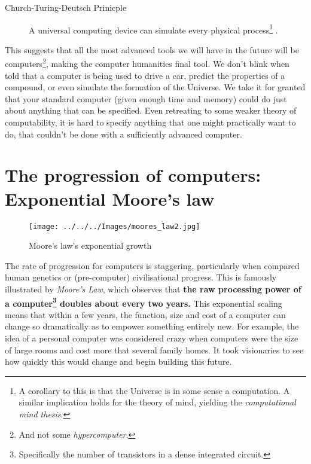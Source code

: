 \documentclass[logo,bsc,singlespacing,parskip]{infthesis}
\begin{document}
\begin{mdframed}
\begin{description}
\item[{\label{orge890011}Church-Turing-Deutsch Prinicple}] A universal computing device can simulate every physical process\footnote{A corollary to this is that the Universe is in some sense a computation. A similar implication holds for the theory of mind, yielding the \emph{computational mind thesis}.} \autocite{deutschQuantumTheoryChurchTuring1985}.
\end{description}
\end{mdframed}

This suggests that all the most advanced tools we will have in the future will be computers\footnote{And not some \emph{hypercomputer}.}, making the computer humanities final tool.
We don't blink when told that a computer is being used to drive a car, predict the properties of a compound, or even simulate the formation of the Universe.
We take it for granted that your standard computer (given enough time and memory) could do just about anything that can be specified.
Even retreating to some weaker theory of computability, it is hard to specify anything that one might practically want to do, that couldn't be done with a sufficiently advanced computer.

\section{The progression of computers: Exponential Moore's law}
\label{sec:org0832b02}
\begin{wrapfigure}{l}{0.51\textwidth}
\centering
\texttt{[image: ../../../Images/moores\_law2.jpg]}
\caption{Moore's law's exponential growth}
\end{wrapfigure}

The rate of progression for computers is staggering, particularly when compared human genetics or (pre-computer) civilisational progress.
This is famously illustrated by \emph{Moore's Law}, which observes that \textbf{the raw processing power of a computer\footnote{Specifically the number of transistors in a dense integrated circuit.} doubles about every two years.}
This exponential scaling means that within a few years, the function, size and cost of a computer can change so dramatically as to empower something entirely new.
For example, the idea of a personal computer was considered crazy when computers were the size of large rooms and cost more that several family homes.
It took visionaries to see how quickly this would change and begin building this future.
\end{document}

